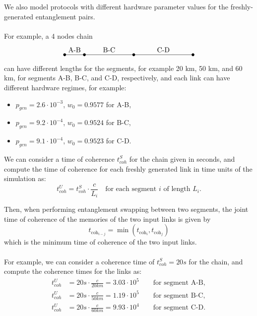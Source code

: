 \documentclass{article}
\begin{document}
We also model protocols with different hardware parameter values for the freshly-generated entanglement pairs.
\\\\
For example, a 4 nodes chain
\begin{equation*}
  \begin{tikzpicture}
    \coordinate (A) at (0, 0);
    \coordinate (B) at (1, 0);
    \coordinate (C) at (3.5, 0);
    \coordinate (D) at (6.5, 0);
  
    \draw (A) -- (B) node[midway, above] {A-B} -- (C) node[midway, above] {B-C} -- (D) node[midway, above] {C-D};
  
    \fill (A) circle (2pt);
    \fill (B) circle (2pt);
    \fill (C) circle (2pt);
    \fill (D) circle (2pt);
  \end{tikzpicture}
\end{equation*}
can have different lengths for the segments, for example 20 km, 50 km, and 60 km, for segments A-B, B-C, and C-D, respectively, and each link can have different hardware regimes, for example:
\begin{itemize}
  \item $p_{gen} = 2.6 \cdot 10^{-3}$, $w_0 = 0.9577$ for A-B,
  \item $p_{gen} = 9.2 \cdot 10^{-4}$, $w_0 = 0.9524$ for B-C,
  \item $p_{gen} = 9.1 \cdot 10^{-4}$, $w_0 = 0.9523$ for C-D.
\end{itemize}

We can consider a time of coherence $t_{coh}^S$ for the chain given in seconds, and compute the time of coherence for each freshly generated link in time units of the simulation as:
\begin{equation*}
  t_{coh}^U = t_{coh}^S \cdot \frac{c}{L_i} \quad \text{for each segment $i$ of length $L_i$} .
\end{equation*}

Then, when performing entanglement swapping between two segments, the joint time of coherence of the memories of the two input links is given by
\begin{equation*}
  t_{\text{coh}_{i-j}} = \min(t_{\text{coh}_i}, t_{\text{coh}_j}) 
\end{equation*}
which is the minimum time of coherence of the two input links.
\\\\
For example, we can consider a coherence time of $t_{coh}^S = 20s$ for the chain, and compute the coherence times for the links as:
\begin{align*}
  t_{coh}^U &= 20s \cdot \frac{c}{20km} = 3.03 \cdot 10^{5} \quad \quad \text{for segment A-B}, \\
  t_{coh}^U &= 20s \cdot \frac{c}{50km} = 1.19 \cdot 10^{5} \quad \quad \text{for segment B-C}, \\
  t_{coh}^U &= 20s \cdot \frac{c}{60km} = 9.93 \cdot 10^{4} \quad \quad \text{for segment C-D}.
\end{align*}
\end{document}

